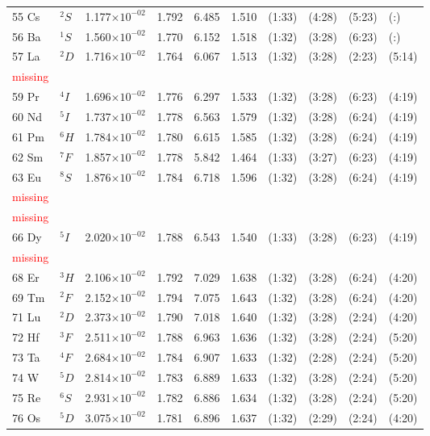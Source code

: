 \documentclass[12pt]{book}
\newcommand{\notetodylan}[1]{\textcolor{red}{#1}} %
\begin{document}
\begin{center}
\begin{longtable}{l l l l l l l l l l}
55 Cs & $^{2}S$ & 1.177$\times10^{-02}$ & 1.792 & 6.485 & 1.510 & (1:33) & (4:28) & (5:23) & (:) \\
56 Ba & $^{1}S$ & 1.560$\times10^{-02}$ & 1.770 & 6.152 & 1.518 & (1:32) & (3:28) & (6:23) & (:) \\
57 La & $^{2}D$ & 1.716$\times10^{-02}$ & 1.764 & 6.067 & 1.513 & (1:32) & (3:28) & (2:23) & (5:14) \\
\notetodylan{missing}	\\
59 Pr & $^{4}I$ & 1.696$\times10^{-02}$ & 1.776 & 6.297 & 1.533 & (1:32) & (3:28) & (6:23) & (4:19) \\
60 Nd & $^{5}I$ & 1.737$\times10^{-02}$ & 1.778 & 6.563 & 1.579 & (1:32) & (3:28) & (6:24) & (4:19) \\
61 Pm & $^{6}H$ & 1.784$\times10^{-02}$ & 1.780 & 6.615 & 1.585 & (1:32) & (3:28) & (6:24) & (4:19) \\
62 Sm & $^{7}F$ & 1.857$\times10^{-02}$ & 1.778 & 5.842 & 1.464 & (1:33) & (3:27) & (6:23) & (4:19) \\
63 Eu & $^{8}S$ & 1.876$\times10^{-02}$ & 1.784 & 6.718 & 1.596 & (1:32) & (3:28) & (6:24) & (4:19) \\
\notetodylan{missing}	\\
\notetodylan{missing}	\\
66 Dy & $^{5}I$ & 2.020$\times10^{-02}$ & 1.788 & 6.543 & 1.540 & (1:33) & (3:28) & (6:23) & (4:19) \\
\notetodylan{missing}	\\
68 Er & $^{3}H$ & 2.106$\times10^{-02}$ & 1.792 & 7.029 & 1.638 & (1:32) & (3:28) & (6:24) & (4:20) \\
69 Tm & $^{2}F$ & 2.152$\times10^{-02}$ & 1.794 & 7.075 & 1.643 & (1:32) & (3:28) & (6:24) & (4:20) \\
71 Lu & $^{2}D$ & 2.373$\times10^{-02}$ & 1.790 & 7.018 & 1.640 & (1:32) & (3:28) & (2:24) & (4:20) \\
72 Hf & $^{3}F$ & 2.511$\times10^{-02}$ & 1.788 & 6.963 & 1.636 & (1:32) & (3:28) & (2:24) & (5:20) \\
73 Ta & $^{4}F$ & 2.684$\times10^{-02}$ & 1.784 & 6.907 & 1.633 & (1:32) & (2:28) & (2:24) & (5:20) \\
74 W & $^{5}D$ & 2.814$\times10^{-02}$ & 1.783 & 6.889 & 1.633 & (1:32) & (3:28) & (2:24) & (5:20) \\
75 Re & $^{6}S$ & 2.931$\times10^{-02}$ & 1.782 & 6.886 & 1.634 & (1:32) & (3:28) & (2:24) & (5:20) \\
76 Os & $^{5}D$ & 3.075$\times10^{-02}$ & 1.781 & 6.896 & 1.637 & (1:32) & (2:29) & (2:24) & (4:20) \\

\end{longtable}
\end{center}
\end{document}
